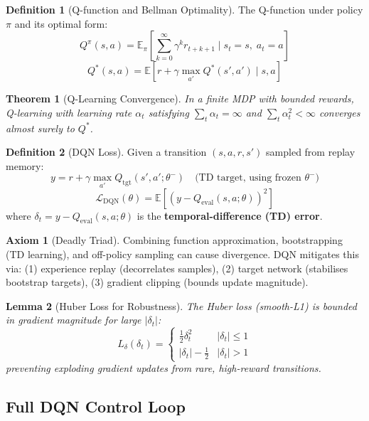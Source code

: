 \documentclass[12pt,a4paper]{article}
\theoremstyle{definition}
\newtheorem{definition}{Definition}[section]
\newtheorem{axiom}{Axiom}[section]
\theoremstyle{plain}
\newtheorem{theorem}{Theorem}[section]
\newtheorem{lemma}[theorem]{Lemma}
\theoremstyle{remark}
\newcommand{\Loss}{\mathcal{L}}
\newcommand{\EE}{\mathbb{E}}
\newcommand{\Qeval}{Q_{\text{eval}}}
\newcommand{\Qtgt}{Q_{\text{tgt}}}
\begin{document}
\begin{definition}[Q-function and Bellman Optimality]
The Q-function under policy $\pi$ and its optimal form:
\[
  Q^\pi(s, a) = \EE_\pi\!\left[\sum_{k=0}^\infty \gamma^k r_{t+k+1} \;\bigg|\; s_t = s,\; a_t = a\right]
\]
\[
  \boxed{Q^*(s, a) = \EE\!\left[r + \gamma \max_{a'} Q^*(s', a') \;\bigg|\; s, a\right]}
\]
\end{definition}

\begin{theorem}[Q-Learning Convergence]
In a finite MDP with bounded rewards, Q-learning with learning rate $\alpha_t$ satisfying $\sum_t \alpha_t = \infty$ and $\sum_t \alpha_t^2 < \infty$ converges almost surely to $Q^*$.
\end{theorem}

\begin{definition}[DQN Loss]
Given a transition $(s, a, r, s')$ sampled from replay memory:
\[
  y = r + \gamma \max_{a'} \Qtgt(s', a'; \theta^-)
  \quad\text{(TD target, using frozen } \theta^-)
\]
\[
  \Loss_{\text{DQN}}(\theta) = \EE\!\left[(y - \Qeval(s, a; \theta))^2\right]
\]
where $\delta_t = y - \Qeval(s, a; \theta)$ is the \textbf{temporal-difference (TD) error}.
\end{definition}

\begin{axiom}[Deadly Triad]
Combining function approximation, bootstrapping (TD learning), and off-policy sampling can cause divergence. DQN mitigates this via: (1) experience replay (decorrelates samples), (2) target network (stabilises bootstrap targets), (3) gradient clipping (bounds update magnitude).
\end{axiom}

\begin{lemma}[Huber Loss for Robustness]
The Huber loss (smooth-L1) is bounded in gradient magnitude for large $|\delta_t|$:
\[
  L_\delta(\delta_t) = \begin{cases}
    \frac{1}{2}\delta_t^2 & |\delta_t| \le 1 \\
    |\delta_t| - \frac{1}{2} & |\delta_t| > 1
  \end{cases}
\]
preventing exploding gradient updates from rare, high-reward transitions.
\end{lemma}

\subsection{Full DQN Control Loop}
\end{document}
